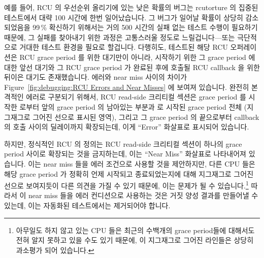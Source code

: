 예를 들어, RCU 의 우선순위 올리기에 있는 낮은 확률의 버그는 rcutorture 의
집중된 테스트에서 대략 100 시간에 한번 일어났습니다.
그 버그가 일어날 확률이 상당히 감소되었음을 99\,\% 확신하기 위해서는 거의 500
시간의 실패 없는 테스트 수행이 필요하기 때문에, 그 실패를 찾아내기 위한  과정은 고통스러울 정도로 느릴겁니다---또는 극단적으로 거대한 테스트
환경을 필요로 할겁니다.
다행히도, 테스트된 해당 RCU 오퍼레이션은 RCU grace period 를 위한 대기만이
아니라, 시작하기 위한 그 grace period 에 대한 앞선 대기와 그 RCU grace period
가 완료된 후에 호출될 RCU callback 을 위한 뒤이은 대기도 존재했습니다.
 에러와 near miss 사이의 차이가
Figure~\ref{fig:debugging:RCU Errors and Near Misses} 에 보여져 있습니다.
완전히 본격적인 에러로 구분되기 위해서, RCU read-side 크리티컬 섹션은 grace
period 를 시작한  로부터 앞의 grace period 의 남아있는 부분과
 로 시작된 grace period 전체 (지그재그로 그어진 선으로 표시된
영역), 그리고 그 grace period 의 끝으로부터 callback 의 호출 사이의 딜레이까지
확장되는데, 이게 ``Error'' 화살표로 표시되어 있습니다.

하지만, 정식적인 RCU 의 정의는 RCU read-side 크리티컬 섹션이 하나의 grace
period 사이로 확장되는 것을 금지하는데, 이는 ``Near Miss'' 화살표로 나타내어져
있습니다.
이는 near miss 들을 에러 조건으로 사용할 것을 제안하지만, 다른 CPU 들은 해당
grace period 가 정확히 언제 시작되고 종료되었는지에 대해 지그재그로 그어진
선으로 보여지듯이 다른 의견을 가질 수 있기 때문에, 이는 문제가 될 수
있습니다.\footnote{
	아무일도 하지 않고 있는 CPU 들은 최근의 수백개의 grace period들에
	대해서도 전혀 알지 못하고 있을 수도 있기 때문에, 이 지그재그로 그어진
	라인들은 상당히 과소평가 되어 있습니다.}
따라서 이 near miss 들을 에러 컨디션으로 사용하는 것은 거짓 양성 결과를
만들어낼 수 있는데, 이는 자동화된  테스트에서는 제거되어야
합니다.
\iffalse

